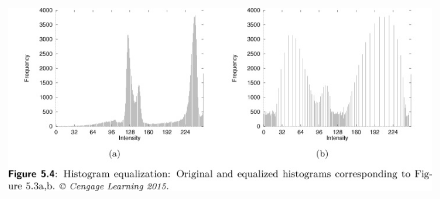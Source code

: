 \documentclass{article}
\begin{document}
\begin{enumerate}[label=A\arabic*)]
\begin{figure}[h!]
\begin{minipage}{0.48\textwidth}
			\end{minipage}
			\hfill
			\begin{minipage}{0.48\textwidth}
				\centering
				\includegraphics[width=.9\linewidth]{img-3.png}
			\end{minipage}
		\end{figure}
\end{enumerate}

\pagebreak
\end{document}
